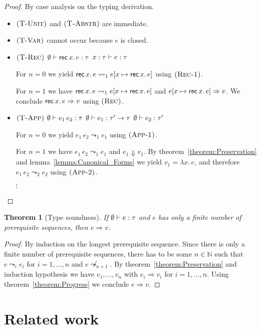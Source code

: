 \documentclass[12pt,a2paper,draft]{article}
\newcommand{\abstr}[2]{\ensuremath{\lambda{#1}.\,{#2}}}
\newcommand{\app}[2]{\ensuremath{{#1}\,{#2}}}
\newcommand{\rec}[2]{\ensuremath{{\normalfont\textsf{rec}}\,{#1}.\,{#2}}}
\newcommand{\Tj}[3]{\mbox{\ensuremath{{#1}\vdash{#2}:{#3}}}}
\newcommand{\tj}[2]{\Tj{\emptyset}{#1}{#2}}
\newcommand{\rn}[1]{\mbox{\ensuremath{\textsc{(#1)}}}}
\newtheorem{theorem}{Theorem}
\begin{document}
\begin{proof}
  By case analysis on the typing derivation.
  \begin{itemize}
  \item \rn{T-Unit} and \rn{T-Abstr} are immediate.
  \item \rn{T-Var} cannot occur because $e$ is closed.
  \item \rn{T-Rec} \quad $\tj{\rec{x}{e}}{\tau}$ \quad $\Tj{x:\tau}{e}{\tau}$

    For $n = 0$ we yield $\rec{x}{e} \leadsto_1 e[x \mapsto \rec{x}{e}]$ using \rn{Rec-1}.

    For $n = 1$ we have $\rec{x}{e} \leadsto_1 e[x \mapsto \rec{x}{e}]$ and
    $e[x \mapsto \rec{x}{e}] \Rightarrow v$. We conclude $\rec{x}{e} \Rightarrow v$
    using \rn{Rec}.

  \item \rn{T-App} \quad $\tj{\app{e_1}{e_2}}{\tau}$ \quad $\tj{e_1}{\tau' \to \tau}$ \quad $\tj{e_2}{\tau'}$

    For $n = 0$ we yield $\app{e_1}{e_2} \leadsto_1 e_1$ using \rn{App-1}.

    For $n = 1$ we have $\app{e_1}{e_2} \leadsto_1 e_1$ and $e_1 \Downarrow v_1$.
    By theorem~\ref{theorem:Preservation} and lemma~\ref{lemma:Canonical_Forms} we
    yield $v_1 = \abstr{x}{e}$, and therefore $\app{e_1}{e_2} \leadsto_2 e_2$ using
    \rn{App-2}.

    $\vdots$
  \end{itemize}
\end{proof}

\begin{theorem}[Type soundness]
  If $\tj{e}{\tau}$ and $e$ has only a finite number of prerequisite sequences, then $e \Rightarrow v$.
\end{theorem}

\begin{proof}
  By induction on the longest prerequisite sequence.
  Since there is only a finite number of prerequisite sequences, there has to be some $n \in \mathbb{N}$
  such that $e \leadsto_i e_i$ for $i = 1,\ldots,n$ and $e \not\leadsto_{n+1}$. By theorem~\ref{theorem:Preservation}
  and induction hypothesis we have $v_1,\ldots,v_n$ with $e_i \Rightarrow v_i$ for $i=1,\ldots,n$. Using
  theorem~\ref{theorem:Progress} we conclude $e \Rightarrow v$.
\end{proof}


\section{Related work}
\end{document}

